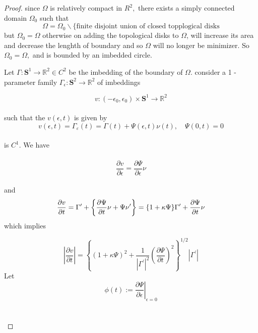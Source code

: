 \documentclass[oneside]{book}
\theoremstyle{definition}
\begin{document}
\begin{proof}

 since $\Omega$ is relatively compact in $R^{2},$ there exists a simply connected
domain $\Omega_{0}$ such that
$$
\Omega=\Omega_{0} \backslash\{\text{finite disjoint union of closed topplogical disks} $$
 but $\Omega_{0}=\Omega $ otherwise on adding the
topological disks to $\Omega$, will increase its area  and decrease the lenghth of boundary and so $\Omega$ will no longer be minimizer. So $\Omega_{0}=\Omega,$ and is bounded by an imbedded circle.\par
Let $\Gamma: \mathbf{S}^{1} \rightarrow \mathbb{R}^{2} \in C^{2}$ be the imbedding of the boundary of $\Omega .$ 
consider a 1 -parameter family $\Gamma_{\epsilon}: \mathbf{S}^{2} \rightarrow \mathbb{R}^{2}$ of imbeddings
\par
$$
v:\left(-\epsilon_{0}, \epsilon_{0}\right) \times \mathbf{S}^{1} \rightarrow \mathbb{R}^{2}
$$ \\
such that the  $v(\epsilon, t)$ is given by \\
    \begin{equation}
    \label{eq10}  
v(\epsilon, t)=\Gamma_{\varepsilon}(t)=\Gamma(t)+\Psi(\epsilon, t) \nu(t), \quad \Psi(0, t)=0
    \end{equation} \\
is $C^{1} .$ We have \\\\
  \begin{equation}
  \label{eq11}  
\frac{\partial v}{\partial \epsilon}=\frac{\partial \Psi}{\partial \epsilon} \nu
    \end{equation}
 \\ 
 and 
     \begin{equation}
     \label{eq12}  
    \\  \frac{\partial v}{\partial t}=\Gamma^{\prime}+\left\{\frac{\partial \Psi}{\partial t} \nu+\Psi \nu^{\prime}\right\}=\{1+\kappa \Psi\} \Gamma^{\prime}+\frac{\partial \Psi}{\partial t} \nu
                   \end{equation}    
which implies  

                    $$\left|\frac{\partial v}{\partial t}\right|=\left\{(1+\kappa \Psi)^{2}+\frac{1}{\left|\Gamma^{\prime}\right|^{2}}\left(\frac{\partial \Psi}{\partial t}\right)^{2}\right\}^{1 / 2}\left|\Gamma^{\prime}\right|$$
Let   \\
                     
                      $$\phi(t):=\left.\frac{\partial \Psi}{\partial \epsilon}\right|_{\epsilon=0}$$ \\\\
                      

\end{proof}
\end{document}

